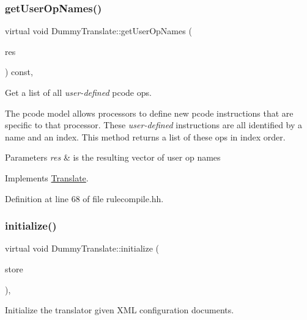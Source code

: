 \subsubsection{\texorpdfstring{getUserOpNames()}{getUserOpNames()}}
{\footnotesize\ttfamily virtual void Dummy\+Translate\+::get\+User\+Op\+Names (\begin{DoxyParamCaption}\item[{vector$<$ string $>$ \&}]{res }\end{DoxyParamCaption}) const\hspace{0.3cm}{\ttfamily [inline]}, {\ttfamily [virtual]}}



Get a list of all {\itshape user-\/defined} pcode ops. 

The pcode model allows processors to define new pcode instructions that are specific to that processor. These {\itshape user-\/defined} instructions are all identified by a name and an index. This method returns a list of these ops in index order. 
\begin{DoxyParams}{Parameters}
{\em res} & is the resulting vector of user op names \\
\hline
\end{DoxyParams}


Implements \mbox{\hyperlink{class_translate_a2475ba8a71e0d514903b3b5458e6cf45}{Translate}}.



Definition at line 68 of file rulecompile.\+hh.

\mbox{\label{class_dummy_translate_a25f1165b176b80b6b8d1a4230230c97e}} 
\subsubsection{\texorpdfstring{initialize()}{initialize()}}
{\footnotesize\ttfamily virtual void Dummy\+Translate\+::initialize (\begin{DoxyParamCaption}\item[{\mbox{\hyperlink{class_document_storage}{Document\+Storage}} \&}]{store }\end{DoxyParamCaption})\hspace{0.3cm}{\ttfamily [inline]}, {\ttfamily [virtual]}}



Initialize the translator given X\+ML configuration documents. 

